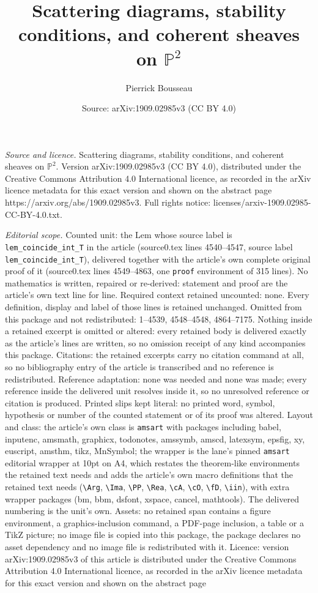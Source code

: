 \documentclass[10pt,a4paper]{amsart}
\title[Scattering diagrams, stability conditions, and coherent shea]{Scattering diagrams, stability conditions, and coherent sheaves on $\mathbb{P}^2$}
\author{Pierrick Bousseau}
\date{Source: arXiv:1909.02985v3 (CC BY 4.0)}
\begin{document}
\maketitle

\noindent\emph{Source and licence.} Scattering diagrams, stability conditions, and coherent sheaves on $\mathbb{P}^2$. Version arXiv:1909.02985v3 (CC BY 4.0), distributed under the Creative Commons Attribution 4.0 International licence, as recorded in the arXiv licence metadata for this exact version and shown on the abstract page https://arxiv.org/abs/1909.02985v3. Full rights notice: licenses/arxiv-1909.02985-CC-BY-4.0.txt.\par\smallskip

\noindent\textit{Editorial scope.} Counted unit: the Lem whose source label is \texttt{lem\_coincide\_int\_T} in the article (source0.tex lines 4540--4547, source label \texttt{lem\_coincide\_int\_T}), delivered together with the article's own complete original proof of it (source0.tex lines 4549--4863, one \texttt{proof} environment of 315 lines). No mathematics is written, repaired or re-derived: statement and proof are the article's own text line for line. Required context retained uncounted: none. Every definition, display and label of those lines is retained unchanged. Omitted from this package and not redistributed: 1--4539, 4548--4548, 4864--7175. Nothing inside a retained excerpt is omitted or altered: every retained body is delivered exactly as the article's lines are written, so no omission receipt of any kind accompanies this package. Citations: the retained excerpts carry no citation command at all, so no bibliography entry of the article is transcribed and no reference is redistributed. Reference adaptation: none was needed and none was made; every reference inside the delivered unit resolves inside it, so no unresolved reference or citation is produced. Printed slips kept literal: no printed word, symbol, hypothesis or number of the counted statement or of its proof was altered. Layout and class: the article's own class is \texttt{amsart} with packages including babel, inputenc, amsmath, graphicx, todonotes, amssymb, amscd, latexsym, epsfig, xy, euscript, amsthm, tikz, MnSymbol; the wrapper is the lane's pinned \texttt{amsart} editorial wrapper at 10pt on A4, which restates the theorem-like environments the retained text needs and adds the article's own macro definitions that the retained text needs (\texttt{\textbackslash Arg}, \texttt{\textbackslash Ima}, \texttt{\textbackslash PP}, \texttt{\textbackslash Rea}, \texttt{\textbackslash cA}, \texttt{\textbackslash cO}, \texttt{\textbackslash fD}, \texttt{\textbackslash iin}), with extra wrapper packages (bm, bbm, dsfont, xspace, cancel, mathtools). The delivered numbering is the unit's own. Assets: no retained span contains a figure environment, a graphics-inclusion command, a PDF-page inclusion, a table or a TikZ picture; no image file is copied into this package, the package declares no asset dependency and no image file is redistributed with it. Licence: version arXiv:1909.02985v3 of this article is distributed under the Creative Commons Attribution 4.0 International licence, as recorded in the arXiv licence metadata for this exact version and shown on the abstract page 
\end{document}
